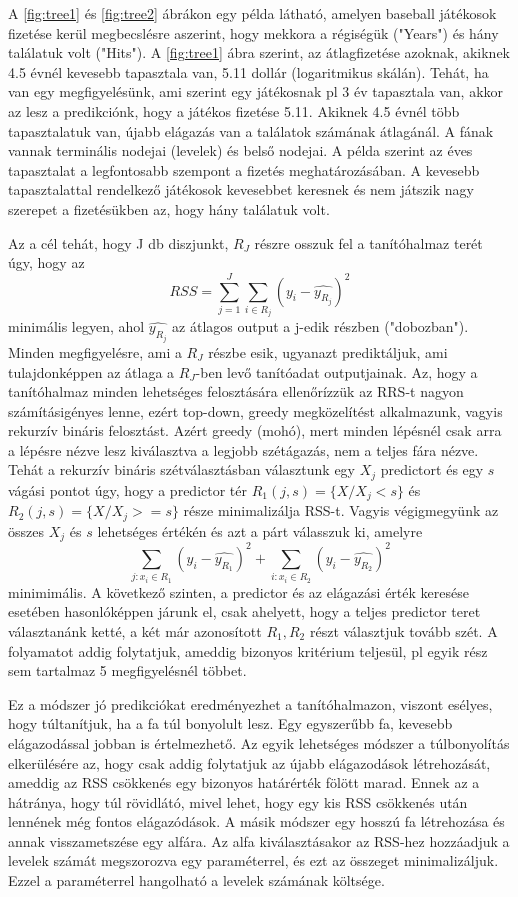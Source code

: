 \documentclass[12pt]{article}
\theoremstyle{plain}
\begin{document}
A \ref{fig:tree1} és \ref{fig:tree2} ábrákon egy példa látható, amelyen baseball játékosok fizetése kerül megbecslésre aszerint, hogy mekkora a régiségük ("Years") és hány találatuk volt ("Hits"). A \ref{fig:tree1} ábra szerint, az átlagfizetése azoknak, akiknek 4.5 évnél kevesebb tapasztala van, 5.11 dollár (logaritmikus skálán). Tehát, ha van egy megfigyelésünk, ami szerint egy játékosnak pl 3 év tapasztala van, akkor az lesz a predikciónk, hogy a játékos fizetése 5.11. Akiknek 4.5 évnél több tapasztalatuk van, újabb elágazás van a találatok számának átlagánál. A fának vannak terminális nodejai (levelek) és belső nodejai. A példa szerint az éves tapasztalat a legfontosabb szempont a fizetés meghatározásában. A kevesebb tapasztalattal rendelkező játékosok kevesebbet keresnek és nem játszik nagy szerepet a fizetésükben az, hogy hány találatuk volt. 

Az a cél tehát, hogy J db diszjunkt, $R_J$ részre osszuk fel a tanítóhalmaz terét úgy, hogy az $$ RSS = \sum_{j=1}^J \sum_{i \in R_j} (y_i - \hat{y_{R_j}})^2$$ minimális legyen, ahol $\hat{y_{R_j}}$ az átlagos output a j-edik részben ("dobozban"). Minden megfigyelésre, ami a $R_J$ részbe esik, ugyanazt prediktáljuk, ami tulajdonképpen az átlaga a $R_J$-ben levő tanítóadat outputjainak. Az, hogy a tanítóhalmaz minden lehetséges felosztására ellenőrízzük az RRS-t nagyon számításigényes lenne, ezért top-down, greedy megközelítést alkalmazunk, vagyis rekurzív bináris felosztást. Azért greedy (mohó), mert minden lépésnél csak arra a lépésre nézve lesz kiválasztva a legjobb szétágazás, nem a teljes fára nézve. 
Tehát a rekurzív bináris szétválasztásban választunk egy $X_j$ predictort és egy $s$ vágási pontot úgy, hogy a predictor tér $R_1(j, s)=\{X/X_j<s\}$ és $R_2(j, s)=\{X/X_j >= s\}$ része minimalizálja RSS-t. Vagyis végigmegyünk az összes $X_j$ és $s$ lehetséges értékén és azt a párt válasszuk ki, amelyre $$ \sum_{j: x_i \in R_1} (y_i - \hat{y_{R_1}})^2 + \sum_{i: x_i \in R_2} (y_i - \hat{y_{R_2}})^2 $$ minimimális. A következő szinten, a predictor és az elágazási érték keresése esetében hasonlóképpen járunk el, csak ahelyett, hogy a teljes predictor teret választanánk ketté, a két már azonosított $R_1, R_2$ részt választjuk tovább szét. A folyamatot addig folytatjuk, ameddig bizonyos kritérium teljesül, pl egyik rész sem tartalmaz 5 megfigyelésnél többet. 

Ez a módszer jó predikciókat eredményezhet a tanítóhalmazon, viszont esélyes, hogy túltanítjuk, ha a fa túl bonyolult lesz. Egy egyszerűbb fa, kevesebb elágazodással jobban is értelmezhető. Az egyik lehetséges módszer a túlbonyolítás elkerülésére az, hogy csak addig folytatjuk az újabb elágazodások létrehozását, ameddig az RSS csökkenés egy bizonyos határérték fölött marad. Ennek az a hátránya, hogy túl rövidlátó, mivel lehet, hogy egy kis RSS csökkenés után lennének még fontos elágazódások. A másik módszer egy hosszú fa létrehozása és annak visszametszése egy alfára. Az alfa kiválasztásakor az RSS-hez hozzáadjuk a levelek számát megszorozva egy paraméterrel, és ezt az összeget minimalizáljuk. Ezzel a paraméterrel hangolható a levelek számának költsége. 
\end{document}
